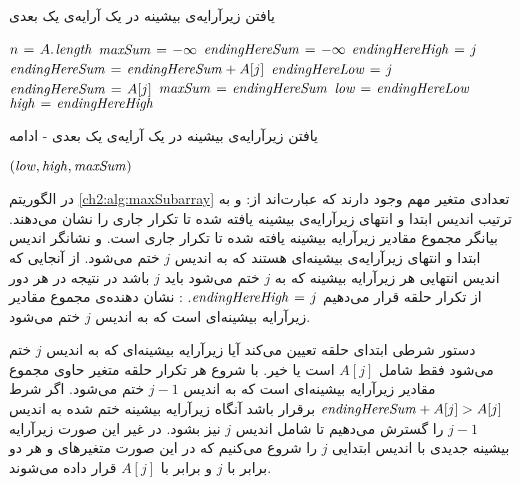 \begin{algorithm}[H]
\caption{یافتن زیرآرایه‌ی بیشینه‌ در یک آرایه‌ی یک بعدی}\label{ch2:alg:maxSubarray}
\begin{latin}
\begin{algorithmic}[1]
	\State	$n\mathrel{\hspace{1pt}=\hspace{1pt}} A.\hspace*{1pt}\mathit{\mathit{length}}$
	\State	$\mathit{maxSum}\mathrel{\hspace{1pt}=\hspace{1pt}} -\infty$
	\State	$\mathit{endingHereSum}\mathrel{\hspace{1pt}=\hspace{1pt}} -\infty$
		\State	$\mathit{endingHereHigh}\mathrel{\hspace{1pt}=\hspace{1pt}} j$
			\State	$\mathit{endingHereSum}\mathrel{\hspace{1pt}=\hspace{1pt}} \mathit{endingHereSum} + A[j]$
		\Else
			\State	$\mathit{endingHereLow}\mathrel{\hspace{1pt}=\hspace{1pt}} j$
			\State	$\mathit{endingHereSum}\mathrel{\hspace{1pt}=\hspace{1pt}} A[j]$
		\EndIf
			\State	$\mathit{maxSum}\mathrel{\hspace{1pt}=\hspace{1pt}} \mathit{endingHereSum}$
			\State	$\mathit{low}\mathrel{\hspace{1pt}=\hspace{1pt}} \mathit{endingHereLow}$
			\State	$\mathit{high}\mathrel{\hspace{1pt}=\hspace{1pt}} \mathit{endingHereHigh}$			
		\EndIf		
		\EndFor		
\end{algorithmic}
\end{latin}
\end{algorithm}

\begin{algorithm}
\caption*{یافتن زیرآرایه‌ی بیشینه‌ در یک آرایه‌ی یک بعدی - ادامه}
\begin{latin}
\begin{algorithmic}[1]
	\State	\Return $(\mathit{low},\mathit{high},\mathit{maxSum})$
\EndFunction
\end{algorithmic}
\end{latin}
\end{algorithm}

در الگوریتم {\eqref{ch2:alg:maxSubarray}} تعدادی متغیر مهم وجود دارند که عبارت‌اند از:
 و {} به ترتیب اندیس ابتدا و انتهای زیرآرایه‌ی بیشینه یافته شده تا تکرار جاری را نشان می‌دهند.
 بیانگر مجموع مقادیر زیرآرایه بیشینه یافته شده تا تکرار جاری است.
 و {} نشانگر اندیس ابتدا و انتهای زیرآرایه‌ی بیشینه‌ای هستند که به اندیس {$j$} ختم می‌شود. از آنجایی که اندیس انتهایی هر زیرآرایه بیشینه که به {$j$} ختم می‌شود باید {$j$} باشد در نتیجه در هر دور از تکرار حلقه قرار می‌دهیم {$\mathit{endingHereHigh}\mathrel{\hspace{1pt}=\hspace{1pt}} j$}.
: نشان دهنده‌ی مجموع مقادیر زیرآرایه بیشینه‌ای است که به اندیس {$j$} ختم می‌شود.

دستور شرطی ابتدای حلقه تعیین می‌کند آیا زیرآرایه بیشینه‌ای که به اندیس {$j$} ختم می‌شود فقط شامل {$A[j]$} است یا خیر. با شروع هر تکرار حلقه متغیر {} حاوی مجموع مقادیر زیرآرایه بیشینه‌ای است که به اندیس {$j-1$} ختم می‌شود. اگر شرط {$\mathit{endingHereSum}+A[j]>A[j]$} برقرار باشد آنگاه زیرآرایه بیشینه ختم شده به اندیس {$j-1$} را گسترش می‌دهیم تا شامل اندیس {$j$} نیز بشود. در غیر این صورت زیرآرایه بیشینه جدیدی با اندیس ابتدایی {$j$} را شروع می‌کنیم که در این صورت متغیرهای {} و {} هر دو برابر با {$j$} و {} برابر با {$A[j]$} قرار داده می‌شوند.


